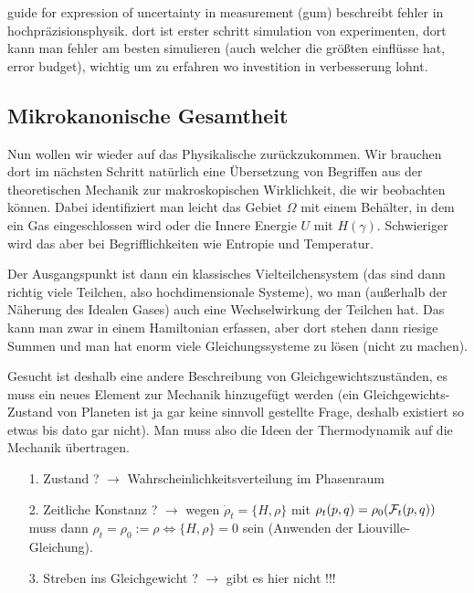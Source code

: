 guide for expression of uncertainty in measurement (gum) beschreibt fehler in hochpräzisionsphysik. dort ist erster schritt simulation von experimenten, dort kann man fehler am besten simulieren (auch welcher die größten einflüsse hat, error budget), wichtig um zu erfahren wo investition in verbesserung lohnt.



	\subsection{Mikrokanonische Gesamtheit}
Nun wollen wir wieder auf das Physikalische zurückzukommen. Wir brauchen dort im nächsten Schritt natürlich eine Übersetzung von Begriffen aus der theoretischen Mechanik zur makroskopischen Wirklichkeit, die wir beobachten können. Dabei identifiziert man leicht das Gebiet $\Omega$ mit einem Behälter, in dem ein Gas eingeschlossen wird oder die Innere Energie $U$ mit $H(\gamma)$. Schwieriger wird das aber bei Begrifflichkeiten wie Entropie und Temperatur.

Der Ausgangspunkt ist dann ein klassisches Vielteilchensystem (das sind dann richtig viele Teilchen, also hochdimensionale Systeme), wo man (außerhalb der Näherung des Idealen Gases) auch eine Wechselwirkung der Teilchen hat. Das kann man zwar in einem Hamiltonian erfassen, aber dort stehen dann riesige Summen und man hat enorm viele Gleichungssysteme zu lösen (nicht zu machen).

Gesucht ist deshalb eine andere Beschreibung von Gleichgewichtszuständen, es muss ein neues Element zur Mechanik hinzugefügt werden (ein Gleichgewichts-Zustand von Planeten ist ja gar keine sinnvoll gestellte Frage, deshalb existiert so etwas bis dato gar nicht). Man muss also die Ideen der Thermodynamik auf die Mechanik übertragen.

\begin{itemize}
\item[1.] Zustand ? $\rightarrow$ Wahrscheinlichkeitsverteilung im Phasenraum

\item[2.] Zeitliche Konstanz ? $\rightarrow$ wegen $\dot{\rho}_t = \{ H, \rho \}$ mit $\rho_t(p,q) = \rho_0\qty(\mathcal{F}_t(p,q))$ muss dann $\rho_t = \rho_0 := \rho \Leftrightarrow \{H, \rho\} = 0$ sein (Anwenden der Liouville-Gleichung).

\item[3.] Streben ins Gleichgewicht ? $\rightarrow$ gibt es hier nicht !!!
\end{itemize}


